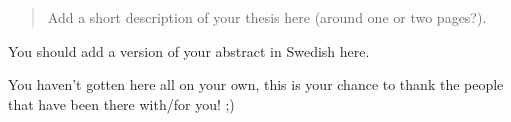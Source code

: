 
\begin{abstract}
    Add a short description of your thesis here (around one or two pages?).
\end{abstract}



\begin{sammanfattning}
    You should add a version of your abstract in Swedish here.
\end{sammanfattning}



\begin{acknowledgements}
    You haven't gotten here all on your own, this is your chance to thank the people that have been there with/for you! ;)
    
\bigskip

\rightline{\VarPhdName}


\end{acknowledgements}